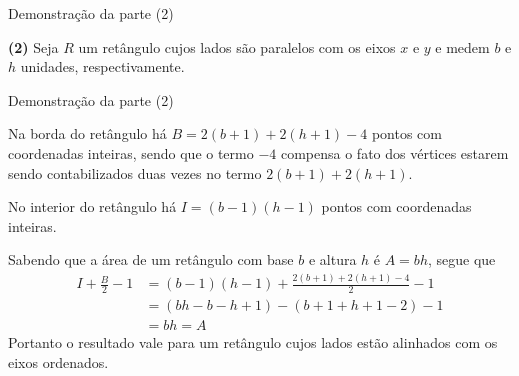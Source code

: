\begin{frame}[fragile]{Demonstração da parte (2)}

    \textbf{(2)} Seja $R$ um retângulo cujos lados são paralelos com os eixos $x$ e $y$ e medem
        $b$ e $h$ unidades, respectivamente.

    \begin{figure}
        \centering

    \end{figure}


\end{frame}

\begin{frame}[fragile]{Demonstração da parte (2)}

    Na borda do retângulo há $B = 2(b + 1) + 2(h + 1) - 4$ pontos com coordenadas inteiras, sendo 
    que o termo $-4$ compensa o fato dos vértices estarem sendo contabilizados duas vezes 
    no termo $2(b + 1) + 2(h + 1)$.
        \pause

    No interior do retângulo há $I = (b - 1)(h - 1)$ pontos com coordenadas inteiras.
        \pause

    Sabendo que a área de um retângulo com base $b$ e altura $h$ é $A = bh$, segue que
    \begin{align*}
        I + \frac{B}{2} - 1 &= (b - 1)(h - 1) + \frac{2(b + 1) + 2(h + 1) - 4}{2} - 1 \\
        &= (bh - b - h + 1) - (b + 1 + h + 1 - 2) - 1 \\
        &= bh = A
    \end{align*} \pause
    Portanto o resultado vale para um retângulo cujos lados estão alinhados com os eixos
    ordenados.
\end{frame}

